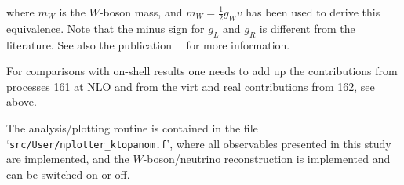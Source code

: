 where $m_W$ is the $W$-boson mass, and $m_W = \frac{1}{2} g_W v$ has
been used to derive this equivalence.  Note that the minus sign for
$g_L$ and $g_R$ is different from the literature. See also the publication~~\cite{Neumann:2019kvk} for more information.

For comparisons with on-shell results one needs to add up the contributions
from processes 161 at NLO and from the virt and real contributions from 162, see above.

The analysis/plotting routine is contained in the file
`\texttt{src/User/nplotter\_ktopanom.f}', where all observables
presented in this study are implemented, and the $W$-boson/neutrino
reconstruction is implemented and can be switched on or off.

